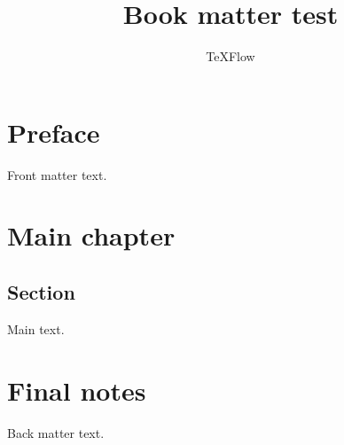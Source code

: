 \documentclass{book}
\title{Book matter test}
\author{TeXFlow}
\begin{document}
\frontmatter
\maketitle
\tableofcontents
\chapter*{Preface}
Front matter text.
\mainmatter
\chapter{Main chapter}
\section{Section}
Main text.
\backmatter
\chapter*{Final notes}
Back matter text.
\end{document}
